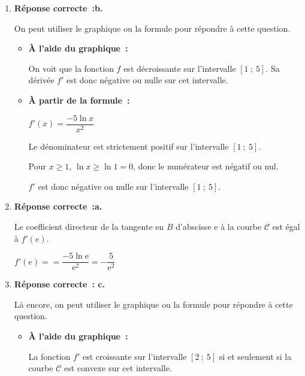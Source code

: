\begin{corrige}
     \begin{enumerate}
          \item
          \textbf{Réponse correcte~:\quad b.}
          \par
          On peut utiliser le graphique ou la formule pour répondre à cette question.
          \begin{itemize}
               \item
               \textbf{\`A l'aide du graphique~:}
               \par
               On voit que la fonction $f$ est décroissante sur l'intervalle $[1~;~5]$. Sa dérivée $f'$ est donc négative ou nulle sur cet intervalle.
               \item
               \textbf{\`A partir de la formule~:}
               \par
               $f'(x) = \dfrac{- 5\ln x}{x^2}$ $\qquad\qquad$
               \par
               Le dénominateur est strictement positif sur l'intervalle $[1~;~5]$.
               \par
               Pour $x \geqslant 1$, $\ln x \geqslant \ln 1 = 0$, donc le numérateur est négatif ou nul.
               \par
               $f'$ est donc négative ou nulle sur l'intervalle $[1~;~5]$.
          \end{itemize}
          \item
          \textbf{Réponse correcte~:\quad a.}
          \par
          Le coefficient directeur de la tangente en $B$ d'abscisse $\text{e}$ à la courbe $\mathscr{C}$ est égal à $f'(e)$.
          \par
          $f'(e)== \dfrac{- 5\ln \text{e}}{\text{e}^2} = - \dfrac{5}{\text{e}^2}$
          \item
          \textbf{Réponse correcte~:\quad\textbf{ c.}}
          \par
          Là encore, on peut utiliser le graphique ou la formule pour répondre à cette question.
          \begin{itemize}
               \item
               \textbf{\`A l'aide du graphique~:}
               \par
               La fonction $f'$ est croissante sur l'intervalle $[2~;~5]$ si et seulement si la courbe $\mathscr{C}$ est convexe sur cet intervalle.
               \par

\end{itemize}
\end{enumerate}
\end{corrige}
